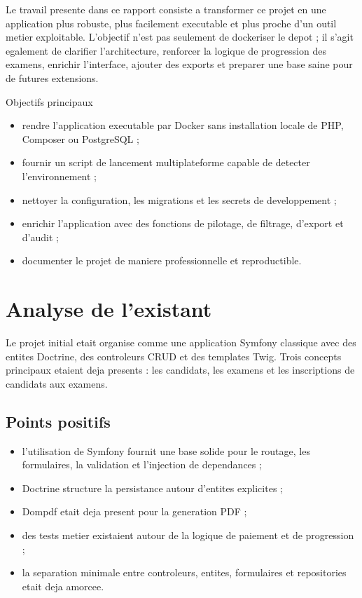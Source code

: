 \documentclass[11pt,a4paper]{article}
\newenvironment{compactitem}{\begin{itemize}[leftmargin=1.2em,itemsep=3pt,topsep=2pt]}{\end{itemize}}
\begin{document}
Le travail presente dans ce rapport consiste a transformer ce projet en une application plus robuste, plus facilement executable et plus proche d'un outil metier exploitable. L'objectif n'est pas seulement de dockeriser le depot ; il s'agit egalement de clarifier l'architecture, renforcer la logique de progression des examens, enrichir l'interface, ajouter des exports et preparer une base saine pour de futures extensions.

\begin{infobox}{Objectifs principaux}
\begin{compactitem}
  \item rendre l'application executable par Docker sans installation locale de PHP, Composer ou PostgreSQL ;
  \item fournir un script de lancement multiplateforme capable de detecter l'environnement ;
  \item nettoyer la configuration, les migrations et les secrets de developpement ;
  \item enrichir l'application avec des fonctions de pilotage, de filtrage, d'export et d'audit ;
  \item documenter le projet de maniere professionnelle et reproductible.
\end{compactitem}
\end{infobox}

\section{Analyse de l'existant}

Le projet initial etait organise comme une application Symfony classique avec des entites Doctrine, des controleurs CRUD et des templates Twig. Trois concepts principaux etaient deja presents : les candidats, les examens et les inscriptions de candidats aux examens.

\subsection{Points positifs}

\begin{compactitem}
  \item l'utilisation de Symfony fournit une base solide pour le routage, les formulaires, la validation et l'injection de dependances ;
  \item Doctrine structure la persistance autour d'entites explicites ;
  \item Dompdf etait deja present pour la generation PDF ;
  \item des tests metier existaient autour de la logique de paiement et de progression ;
  \item la separation minimale entre controleurs, entites, formulaires et repositories etait deja amorcee.
\end{compactitem}
\end{document}
